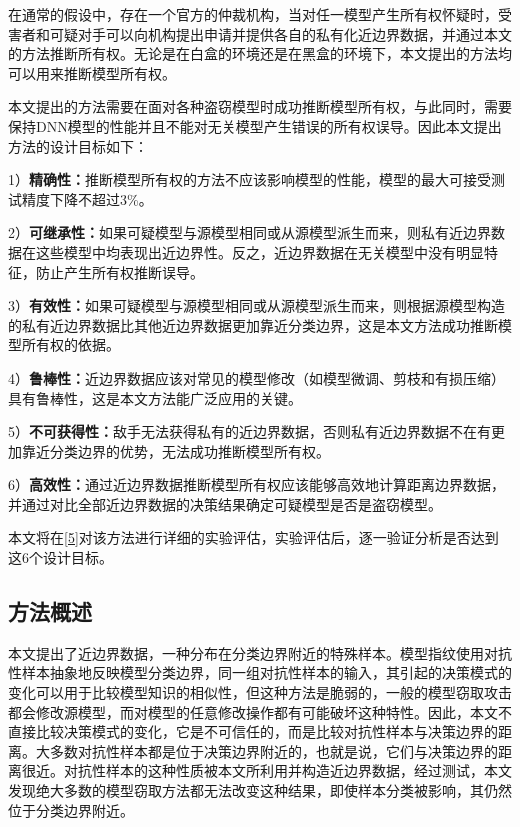 在通常的假设中，存在一个官方的仲裁机构，当对任一模型产生所有权怀疑时，受害者和可疑对手可以向机构提出申请并提供各自的私有化近边界数据，并通过本文的方法推断所有权。无论是在白盒的环境还是在黑盒的环境下，本文提出的方法均可以用来推断模型所有权。

本文提出的方法需要在面对各种盗窃模型时成功推断模型所有权，与此同时，需要保持DNN模型的性能并且不能对无关模型产生错误的所有权误导。因此本文提出方法的设计目标如下：

1）\textbf{精确性：}推断模型所有权的方法不应该影响模型的性能，模型的最大可接受测试精度下降不超过3\%。

2）\textbf{可继承性：}如果可疑模型与源模型相同或从源模型派生而来，则私有近边界数据在这些模型中均表现出近边界性。反之，近边界数据在无关模型中没有明显特征，防止产生所有权推断误导。

3）\textbf{有效性：}如果可疑模型与源模型相同或从源模型派生而来，则根据源模型构造的私有近边界数据比其他近边界数据更加靠近分类边界，这是本文方法成功推断模型所有权的依据。

4）\textbf{鲁棒性：}近边界数据应该对常见的模型修改（如模型微调、剪枝和有损压缩）具有鲁棒性，这是本文方法能广泛应用的关键。

5）\textbf{不可获得性：}敌手无法获得私有的近边界数据，否则私有近边界数据不在有更加靠近分类边界的优势，无法成功推断模型所有权。

6）\textbf{高效性：}通过近边界数据推断模型所有权应该能够高效地计算距离边界数据，并通过对比全部近边界数据的决策结果确定可疑模型是否是盗窃模型。

本文将在\ref{5}对该方法进行详细的实验评估，实验评估后，逐一验证分析是否达到这6个设计目标。

\subsection{方法概述}

本文提出了近边界数据，一种分布在分类边界附近的特殊样本。模型指纹\cite{cao2021ipguard}使用对抗性样本抽象地反映模型分类边界，同一组对抗性样本的输入，其引起的决策模式的变化可以用于比较模型知识的相似性，但这种方法是脆弱的，一般的模型窃取攻击都会修改源模型，而对模型的任意修改操作都有可能破坏这种特性。因此，本文不直接比较决策模式的变化，它是不可信任的，而是比较对抗性样本与决策边界的距离。大多数对抗性样本都是位于决策边界附近的，也就是说，它们与决策边界的距离很近。对抗性样本的这种性质被本文所利用并构造近边界数据，经过测试，本文发现绝大多数的模型窃取方法都无法改变这种结果，即使样本分类被影响，其仍然位于分类边界附近。

